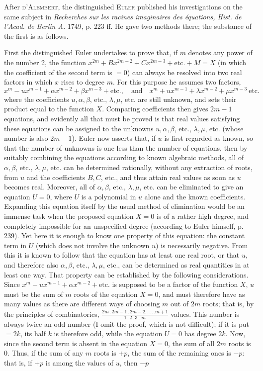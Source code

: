 After \textsc{d'Alembert}, the distinguished \textsc{Euler} published his investigations on the same subject in \textit{Recherches sur les racines imaginaires des équations, Hist. de l'Acad. de Berlin A.} 1749, p. 223 ff. He gave two methods there; the substance of the first is as follows.

First the distinguished Euler undertakes to prove that, if $m$ denotes any power of the number 2, the function $x^{2m}+Bx^{2m-2}+Cx^{2m-3}+\text{etc.}+M=X$ (in which the coefficient of the second term is $=0$) can always be resolved into two real factors in which $x$ rises to degree $m$. For this purpose he assumes two factors,
\[
x^m-ux^{m-1}+\alpha x^{m-2}+\beta x^{m-3}+\text{etc.},\quad\text{and}\quad x^m+ux^{m-1}+\lambda x^{m-2}+\mu x^{m-3}\ \text{etc.}
\]
where the coefficients $u,\alpha,\beta$, etc., $\lambda,\mu$, etc. are still unknown, and sets their product equal to the function $X$. Comparing coefficients then gives $2m-1$ equations, and evidently all that must be proved is that real values satisfying these equations can be assigned to the unknowns $u,\alpha,\beta$, etc., $\lambda,\mu$, etc. (whose number is also $2m-1$). Euler now asserts that, if $u$ is first regarded as known, so that the number of unknowns is one less than the number of equations, then by suitably combining the equations according to known algebraic methods, all of $\alpha,\beta$, etc., $\lambda,\mu$, etc. can be determined rationally, without any extraction of roots, from $u$ and the coefficients $B,C$, etc., and thus attain real values as soon as $u$ becomes real. Moreover, all of $\alpha,\beta$, etc., $\lambda,\mu$, etc. can be eliminated to give an equation $U=0$, where $U$ is a polynomial in $u$ alone and the known coefficients. Expanding this equation itself by the usual method of elimination would be an immense task when the proposed equation $X=0$ is of a rather high degree, and completely impossible for an unspecified degree (according to Euler himself, p. 239). Yet here it is enough to know one property of this equation: the constant term in $U$ (which does not involve the unknown $u$) is necessarily negative. From this it is known to follow that the equation has at least one real root, or that $u$, and therefore also $\alpha,\beta$, etc., $\lambda,\mu$, etc., can be determined as real quantities in at least one way. That property can be established by the following considerations. Since $x^m-ux^{m-1}+\alpha x^{m-2}+\text{etc.}$ is supposed to be a factor of the function $X$, $u$ must be the sum of $m$ roots of the equation $X=0$, and must therefore have as many values as there are different ways of choosing $m$ out of $2m$ roots; that is, by the principles of combinatorics, $\frac{2m\mathbin{.}\overline{2m-1}\mathbin{.}\overline{2m-2}.\,.\,.\,.\,.\overline{m+1}}{1\mathbin{.}2\mathbin{.}3\ldots m}$ values. This number is always twice an odd number (I omit the proof, which is not difficult); if it is put $=2k$, its half $k$ is therefore odd, while the equation $U=0$ has degree $2k$. Now, since the second term is absent in the equation $X=0$, the sum of all $2m$ roots is 0. Thus, if the sum of any $m$ roots is $+p$, the sum of the remaining ones is $-p$: that is, if $+p$ is among the values of $u$, then $-p$ 